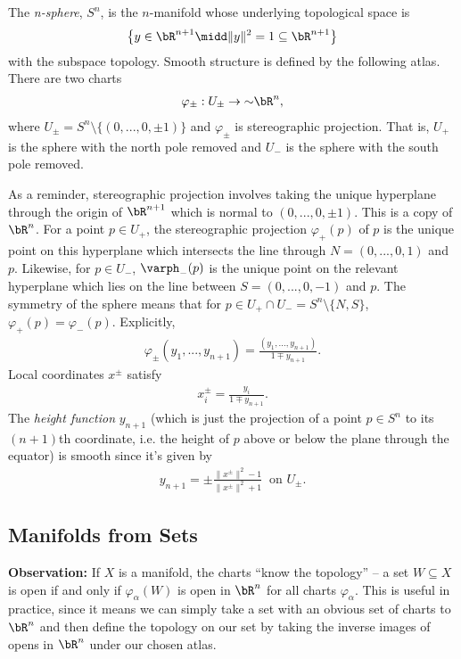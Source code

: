 \begin{example}\label{expl:n-sphere}
	The \emph{n-sphere}, $S^n$, is the $n$-manifold whose underlying topological space is
	\begin{align*}
		\left\{y \in \bR^{n+1} \midd \|y\|^2 = 1 \subseteq \bR^{n+1}\right\}
	\end{align*}
	with the subspace topology. Smooth structure is defined by the following atlas. There are two charts 
	\begin{align*}
		\varphi_{\pm}:U_{\pm} \to{\sim} \bR^n,
	\end{align*}
	where $U_{\pm} = S^n \setminus \{(0,...,0,\pm 1)\}$ and $\varphi_{\pm}$ is stereographic projection. That is, $U_+$ is the sphere with the north pole removed and $U_-$ is the sphere with the south pole removed.

    As a reminder, stereographic projection involves taking the unique hyperplane through the origin of $\bR^{n+1}$ which is normal to $(0,...,0,\pm 1)$. This is a copy of $\bR^n$. For a point $p \in U_+$, the stereographic projection $\varphi_+(p)$ of $p$ is the unique point on this hyperplane which intersects the line through $N = (0,...,0,1)$ and $p$. Likewise, for $p \in U_-$, $\varph_-(p)$ is the unique point on the relevant hyperplane which lies on the line between $S = (0,...,0,-1)$ and $p$. The symmetry of the sphere means that for $p \in U_+ \cap U_- = S^n \setminus \{N,S\}$, $\varphi_+(p) = \varphi_-(p)$. Explicitly,
    \begin{align*}
    	\varphi_\pm(y_1,...,y_{n+1}) = \frac{(y_1,...,y_{n+1})}{1 \mp y_{n+1}}.
    \end{align*}
    Local coordinates $x^\pm$ satisfy
    \begin{align*}
	    x_i^\pm = \frac{y_i}{1 \mp y_{n+1}}.
    \end{align*}
    The \emph{height function} $y_{n+1}$ (which is just the projection of a point $p \in S^{n}$ to its $(n+1)$th coordinate, i.e. the height of $p$ above or below the plane through the equator) is smooth since it's given by
	\begin{align*}
		y_{n+1} = \pm \frac{\|x^\pm\|^2 - 1}{\|x^\pm\|^2 + 1} ~ \text{ on } U_\pm.
	\end{align*}
\end{example}

\subsection{Manifolds from Sets}
\textbf{Observation:} If $X$ is a manifold, the charts ``know the topology'' -- a set $W \subseteq X$ is open if and only if $\varphi_\alpha(W)$ is open in $\bR^n$ for all charts $\varphi_\alpha$. This is useful in practice, since it means we can simply take a set with an obvious set of charts to $\bR^n$ and then define the topology on our set by taking the inverse images of opens in $\bR^n$ under our chosen atlas.

